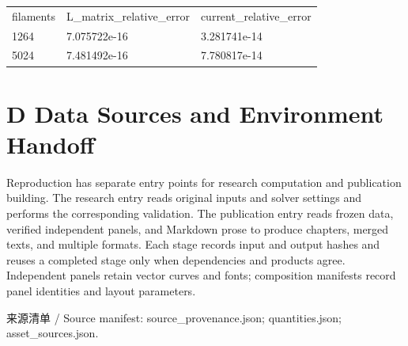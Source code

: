 \documentclass[journal,10pt]{IEEEtran}
\begin{document}
\begin{table}[!htbp]
\par
\begingroup\footnotesize\begin{tabular}{p{55.26666666666667mm}|p{55.26666666666667mm}|p{55.26666666666667mm}}
\toprule
filaments & L\_\allowbreak matrix\_\allowbreak relative\_\allowbreak error & current\_\allowbreak relative\_\allowbreak error\\
1264 & 7.075722e-16 & 3.281741e-14\\
5024 & 7.481492e-16 & 7.780817e-14\\
\bottomrule\end{tabular}\endgroup
\end{table}
\FloatBarrier
\section*{D Data Sources and Environment Handoff}
\hypertarget{chapter-D}{}
Reproduction has separate entry points for research computation and publication building. The research entry reads original inputs and solver settings and performs the corresponding validation. The publication entry reads frozen data, verified independent panels, and Markdown prose to produce chapters, merged texts, and multiple formats. Each stage records input and output hashes and reuses a completed stage only when dependencies and products agree. Independent panels retain vector curves and fonts; composition manifests record panel identities and layout parameters.


来源清单 / Source manifest: source\_provenance.json; quantities.json; asset\_sources.json.
\end{document}
